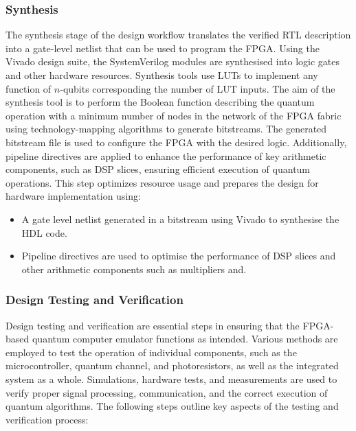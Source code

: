 \subsubsection*{Synthesis}

The synthesis stage of the design workflow translates the verified RTL description into a gate-level netlist that can be used to program the FPGA. Using the Vivado design suite, the SystemVerilog modules are synthesised into logic gates and other hardware resources. Synthesis tools use LUTs to implement any function of $n$-qubits corresponding the number of LUT inputs. The aim of the synthesis tool is to perform the Boolean function describing the quantum operation with a minimum number of nodes in the network of the FPGA fabric using technology-mapping algorithms to generate bitstreams. The generated bitstream file is used to configure the FPGA with the desired logic. Additionally, pipeline directives are applied to enhance the performance of key arithmetic components, such as DSP slices, ensuring efficient execution of quantum operations. This step optimizes resource usage and prepares the design for hardware implementation using:

\begin{itemize}
	\item 
	A gate level netlist generated in a bitstream using Vivado to synthesise the HDL code.
	\item 
	Pipeline directives are used to optimise the performance of DSP slices and other arithmetic components such as multipliers and.
\end{itemize}

\subsubsection*{Design Testing and Verification}

Design testing and verification are essential steps in ensuring that the FPGA-based quantum computer emulator functions as intended. Various methods are employed to test the operation of individual components, such as the microcontroller, quantum channel, and photoresistors, as well as the integrated system as a whole. Simulations, hardware tests, and measurements are used to verify proper signal processing, communication, and the correct execution of quantum algorithms. The following steps outline key aspects of the testing and verification process:

